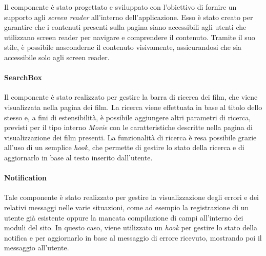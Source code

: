 Il componente è stato progettato e sviluppato con l'obiettivo di fornire un supporto agli \textit{screen reader} all'interno dell'applicazione. 
Esso è stato creato per garantire che i contenuti presenti sulla pagina siano accessibili agli utenti che utilizzano screen reader per navigare e comprendere il contenuto.
Tramite il suo stile, è possibile nasconderne il contenuto visivamente, assicurandosi che sia accessibile solo agli screen reader.

\paragraph{SearchBox}\label{par:searchbox}

Il componente è stato realizzato per gestire la barra di ricerca dei film, che viene visualizzata nella pagina dei film.
La ricerca viene effettuata in base al titolo dello stesso e, a fini di estensibilità, è possibile aggiungere altri parametri di ricerca, previsti per il tipo interno \textit{Movie}
con le caratteristiche descritte nella pagina di visualizzazione dei film presenti.
La funzionalità di ricerca è resa possibile grazie all'uso di un semplice \textit{hook}, che permette di gestire lo stato della ricerca e di aggiornarlo in base al testo inserito dall'utente.

\paragraph{Notification}\label{par:notification}

Tale componente è stato realizzato per gestire la visualizzazione degli errori e dei relativi messaggi nelle varie situazioni, come ad esempio la registrazione di un utente già esistente
oppure la mancata compilazione di campi all'interno dei moduli del sito. In questo caso, viene utilizzato un \textit{hook} per gestire lo stato della notifica e per aggiornarlo in base al messaggio
di errore ricevuto, mostrando poi il messaggio all'utente.